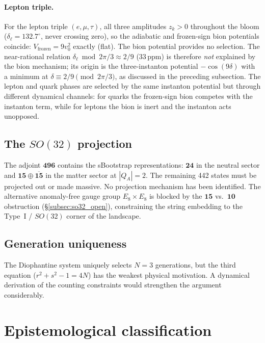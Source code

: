 \documentclass[12pt,a4paper]{article}
\begin{document}
\paragraph{Lepton triple.}
For the lepton triple $(e,\mu,\tau)$, all three amplitudes
$z_k > 0$ throughout the bloom ($\delta_\ell = 132.7^\circ$,
never crossing zero), so the adiabatic and frozen-sign bion potentials
coincide: $V_{\mathrm{frozen}} = 9v_0^2$ exactly (flat).
The bion potential provides no selection.
The near-rational relation $\delta_\ell \bmod 2\pi/3 \approx 2/9$
($33\,\mathrm{ppm}$) is therefore \emph{not} explained by the
bion mechanism; its origin is the three-instanton potential
$-\cos(9\delta)$ with a minimum at $\delta \equiv 2/9 \pmod{2\pi/3}$,
as discussed in the preceding subsection.
The lepton and quark phases are selected by the same instanton
potential but through different dynamical channels:
for quarks the frozen-sign bion competes with the instanton term,
while for leptons the bion is inert and the instanton acts unopposed.

\subsection{The $SO(32)$ projection}
The adjoint $\mathbf{496}$ contains the sBootstrap
representations: $\mathbf{24}$ in the neutral sector and
$\mathbf{15} \oplus \overline{\mathbf{15}}$ in the matter
sector at $|Q_A| = 2$. The remaining 442 states must be
projected out or made massive. No projection mechanism has been
identified. The alternative anomaly-free gauge group
$E_8 \times E_8$ is blocked by the $\mathbf{15}$ vs.\
$\mathbf{10}$ obstruction (\S\ref{subsec:so32_open}),
constraining the string embedding to the Type~I / $SO(32)$
corner of the landscape.

\subsection{Generation uniqueness}
The Diophantine system uniquely selects $N = 3$ generations,
but the third equation ($r^2 + s^2 - 1 = 4N$) has the weakest
physical motivation. A dynamical derivation of the counting
constraints would strengthen the argument considerably.

\section{Epistemological classification}
\label{sec:epistemology}
\end{document}
